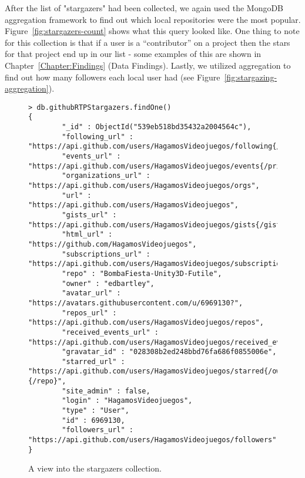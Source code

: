 After the list of "stargazers" had been collected, we again used the MongoDB aggregation framework to find out which local repositories were the most popular.  Figure~\ref{fig:stargazers-count} shows what this query looked like. One thing to note for this collection is that if a user is a “contributor” on a project then the stars for that project end up in our list - some examples of this are shown in Chapter~\ref{Chapter:Findings} (Data Findings). Lastly, we utilized aggregation to find out how many followers each local user had (see Figure~\ref{fig:stargazing-aggregation}).

\begin{figure}
\tiny
\begin{lstlisting}
> db.githubRTPStargazers.findOne()
{
        "_id" : ObjectId("539eb518bd35432a2004564c"),
        "following_url" : "https://api.github.com/users/HagamosVideojuegos/following{/other_user}",
        "events_url" : "https://api.github.com/users/HagamosVideojuegos/events{/privacy}",
        "organizations_url" : "https://api.github.com/users/HagamosVideojuegos/orgs",
        "url" : "https://api.github.com/users/HagamosVideojuegos",
        "gists_url" : "https://api.github.com/users/HagamosVideojuegos/gists{/gist_id}",
        "html_url" : "https://github.com/HagamosVideojuegos",
        "subscriptions_url" : "https://api.github.com/users/HagamosVideojuegos/subscriptions",
        "repo" : "BombaFiesta-Unity3D-Futile",
        "owner" : "edbartley",
        "avatar_url" : "https://avatars.githubusercontent.com/u/6969130?",
        "repos_url" : "https://api.github.com/users/HagamosVideojuegos/repos",
        "received_events_url" : "https://api.github.com/users/HagamosVideojuegos/received_events",
        "gravatar_id" : "028308b2ed248bbd76fa686f0855006e",
        "starred_url" : "https://api.github.com/users/HagamosVideojuegos/starred{/owner}{/repo}",
        "site_admin" : false,
        "login" : "HagamosVideojuegos",
        "type" : "User",
        "id" : 6969130,
        "followers_url" : "https://api.github.com/users/HagamosVideojuegos/followers"
}
\end{lstlisting}
\caption{A view into the stargazers collection.}
\label{fig:stargazers}
\end{figure}



